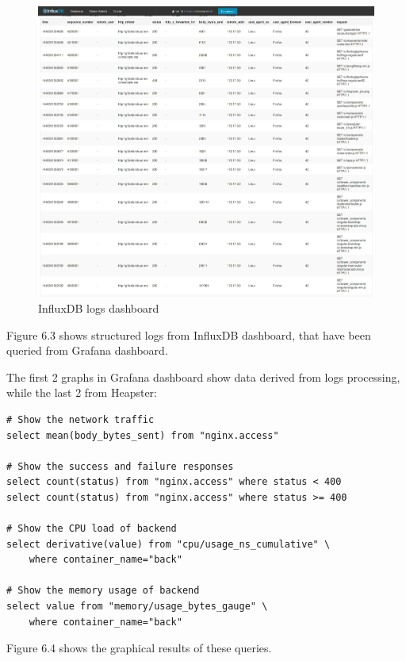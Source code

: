 \begin{figure}[htbp]
\centering
\includegraphics{media/ch6-influxdb.png}
\caption{InfluxDB logs dashboard}
\end{figure}

Figure 6.3 shows structured logs from InfluxDB dashboard, that have been queried from Grafana dashboard.

The first 2 graphs in Grafana dashboard show data derived from logs processing, while the last 2 from Heapster:

\begin{verbatim}
# Show the network traffic
select mean(body_bytes_sent) from "nginx.access"

# Show the success and failure responses
select count(status) from "nginx.access" where status < 400
select count(status) from "nginx.access" where status >= 400

# Show the CPU load of backend
select derivative(value) from "cpu/usage_ns_cumulative" \
    where container_name="back"

# Show the memory usage of backend
select value from "memory/usage_bytes_gauge" \
    where container_name="back"
\end{verbatim}

Figure 6.4 shows the graphical results of these queries.

